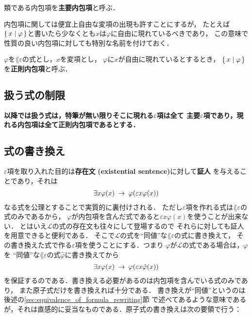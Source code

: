 	\begin{screen}
		\begin{dfn}[主要内包項]
			類である内包項を{\bf 主要内包項}と呼ぶ．
		\end{dfn}
	\end{screen}
	
	内包項に関しては便宜上自由な変項の出現も許すことにするが，
	たとえば$\{\, x \mid \varphi\, \}$と書いたら少なくとも$x$は$\varphi$に自由に現れているべきであり，
	この意味で性質の良い内包項に対しても特別な名前を付けておく．
	
	\begin{screen}
		\begin{dfn}[正則内包項]
			$\varphi$を$\lang{\varepsilon}$の式とし，$x$を変項とし，
			$\varphi$に$x$が自由に現れているとするとき，
			$\{\, x \mid \varphi\, \}$を{\bf 正則内包項}\index{せいそくないほうこう@正則内包項}と呼ぶ．
		\end{dfn}
	\end{screen}
	
\subsection{扱う式の制限}
\label{sec:restriction_of_formulas}
	{\bf 以降では扱う式は，特筆が無い限りそこに現れる$\varepsilon$項は全て
	主要$\varepsilon$項であり，現れる内包項は全て正則内包項であるとする．}

\subsection{式の書き換え}
	$\varepsilon$項を取り入れた目的は{\bf 存在文}
	{\bf (existential sentence)}に対して{\bf 証人}
	を与えることであり，それは
	\begin{align}
		\exists x \varphi(x) \hspace{0.25em}\rightarrow\hspace{0.25em} \varphi(\varepsilon x \varphi(x))
	\end{align}
	なる式を公理とすることで実質的に裏付けされる．
	ただし$\varepsilon$項を作れる式は$\lang{\varepsilon}$の式のみであるから，
	$\varphi$が内包項を含んだ式であると$\varepsilon x \varphi(x)$を使うことが出来ない．
	とはいえ$\mathcal{L}$の式の存在文も往々にして登場するので
	それらに対しても証人を用意できると便利である．
	そこで$\mathcal{L}$の式を``同値''な$\lang{\varepsilon}$の式に書き換えて，
	その書き換えた式で作る$\varepsilon$項を使うことにする．つまり
	$\varphi$が$\mathcal{L}$の式である場合は，$\varphi$を
	``同値''な$\lang{\varepsilon}$の式$\hat{\varphi}$に書き換えてから
	\begin{align}
		\exists x \varphi(x) \hspace{0.25em}\rightarrow\hspace{0.25em} \varphi(\varepsilon x \hat{\varphi}(x))
	\end{align}
	を保証するのである．書き換える必要があるのは内包項を含んでいる式のみであり，
	また原子式だけを書き換えれば十分である．
	書き換えが``同値''というのは後述の\ref{sec:equivalence_of_formula_rewriting}節
	で述べてあるような意味であるが，それは直感的に妥当なものである．原子式の書き換えは次の要領で行う：
	
